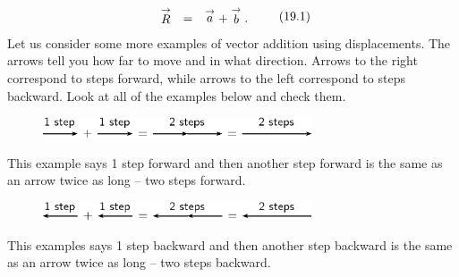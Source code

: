     \begin{equation}
    \begin{array}{ccc}\hfill \stackrel{\to }{R}& =& \stackrel{\to }{a}+\stackrel{\to }{b}.\hfill \end{array}\tag{19.1}
      \end{equation}
        \label{m38813*id188482}Let us consider some more examples of vector addition using displacements. The arrows tell you how far to move and in what
direction. Arrows to the right correspond to steps forward, while
arrows to the left correspond to steps backward. Look at all of the
examples below and check them.\par 
        \label{m38813*id186651}
    \setcounter{subfigure}{0}
	\begin{figure}[H] %
    \begin{center}
    \label{m38813*id186654!!!underscore!!!media}\label{m38813*id186654!!!underscore!!!printimage}\includegraphics[width=300px]{col11305.imgs/m38813_PG11C1_014.png} %
      \vspace{2pt}
    \vspace{.1in}
    \end{center}
 \end{figure}       
        \par 
        \label{m38813*id186661}This example says 1 step forward and then another step forward is the same as an arrow twice as long -- two steps forward.\par 
        \label{m38813*id186668}
    \setcounter{subfigure}{0}
	\begin{figure}[H] %
    \begin{center}
    \label{m38813*id186672!!!underscore!!!media}\label{m38813*id186672!!!underscore!!!printimage}\includegraphics[width=300px]{col11305.imgs/m38813_PG11C1_015.png} %
      \vspace{2pt}
    \vspace{.1in}
    \end{center}
 \end{figure}       
        \par 
        \label{m38813*id186678}This examples says 1 step backward and then another step backward is the same as an arrow twice as long -- two steps backward.\par 
